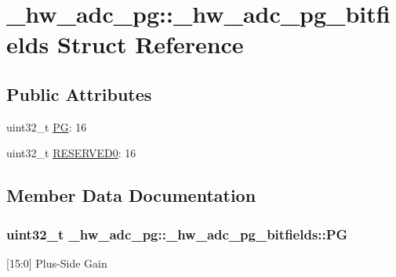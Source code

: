 \hypertarget{struct__hw__adc__pg_1_1__hw__adc__pg__bitfields}{}\section{\+\_\+hw\+\_\+adc\+\_\+pg\+:\+:\+\_\+hw\+\_\+adc\+\_\+pg\+\_\+bitfields Struct Reference}
\label{struct__hw__adc__pg_1_1__hw__adc__pg__bitfields}
\subsection*{Public Attributes}
\begin{DoxyCompactItemize}
\item 
uint32\+\_\+t \hyperlink{struct__hw__adc__pg_1_1__hw__adc__pg__bitfields_a2de8c340f0cfd9324bfec255396dd330}{PG}\+: 16
\item 
uint32\+\_\+t \hyperlink{struct__hw__adc__pg_1_1__hw__adc__pg__bitfields_a222cd4893465c503d06675c00f989599}{R\+E\+S\+E\+R\+V\+E\+D0}\+: 16
\end{DoxyCompactItemize}


\subsection{Member Data Documentation}
\subsubsection[{\texorpdfstring{PG}{PG}}]{\setlength{\rightskip}{0pt plus 5cm}uint32\+\_\+t \+\_\+hw\+\_\+adc\+\_\+pg\+::\+\_\+hw\+\_\+adc\+\_\+pg\+\_\+bitfields\+::\+PG}\hypertarget{struct__hw__adc__pg_1_1__hw__adc__pg__bitfields_a2de8c340f0cfd9324bfec255396dd330}{}\label{struct__hw__adc__pg_1_1__hw__adc__pg__bitfields_a2de8c340f0cfd9324bfec255396dd330}
\mbox{[}15\+:0\mbox{]} Plus-\/\+Side Gain 

